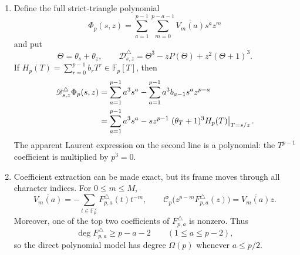 \begin{proposition}
\begin{enumerate}
\item Define the full strict-triangle polynomial
  \[
   \Phi_p(s,z)=
   \sum_{a=1}^{p-1}\sum_{m=0}^{p-a-1}
    \overline{V_m(a)}s^az^m
  \]
  and put
  \[
   \Theta=\theta_s+\theta_z,
   \qquad
   \mathscr D_{s,z}^{\triangle}
   =\Theta^3-zP(\Theta)+z^2(\Theta+1)^3.
  \]
  If $H_p(T)=\sum_{r=0}^{p-1}b_rT^r\in\mathbb F_p[T]$, then
  \begin{align}
   \mathscr D_{s,z}^{\triangle}\Phi_p(s,z)
   &={\sum_{a=1}^{p-1}a^3s^a}
     -{\sum_{a=1}^{p-1}a^3b_{a-1}s^az^{p-a}}
     \label{eq:bivariate-strict-triangle-defect}\\
   &={\sum_{a=1}^{p-1}a^3s^a}
     -sz^{p-1}
       \left.(\theta_T+1)^3H_p(T)\right|_{T=s/z}.
     \notag
  \end{align}
  The apparent Laurent expression on the second line is a polynomial:
  the $T^{p-1}$ coefficient is multiplied by $p^3=0$.

\item Coefficient extraction can be made exact, but its frame moves through
  all character indices.  For $0\leq m\leq M$,
  \begin{equation}
   \overline{V_m(a)}
   =-\sum_{t\in\mathbb F_p^\times}
       F_{p,a}^{\triangle}(t)t^{-m},
   \qquad
   \mathcal C_p\bigl(z^{p-m}F_{p,a}^{\triangle}(z)\bigr)
   =\overline{V_m(a)}z.
   \label{eq:green-complete-Mellin-Cartier-extraction}
  \end{equation}
  Moreover, one of the top two coefficients of
  $F_{p,a}^{\triangle}$ is nonzero.  Thus
  \begin{equation}
   \deg F_{p,a}^{\triangle}\geq p-a-2
   \qquad(1\leq a\leq p-2),
   \label{eq:green-truncation-linear-degree}
  \end{equation}
  so the direct polynomial model has degree $\Omega(p)$ whenever
  $a\leq p/2$.
\end{enumerate}
\end{proposition}


